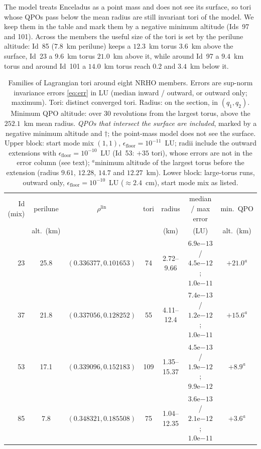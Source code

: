 \documentclass[11pt]{article}
\begin{document}
The model treats Enceladus as a point mass and does not see its surface, so tori whose QPOs pass
below the mean radius are still invariant tori of the model. We keep them in the table and mark
them by a negative minimum altitude (Ids~97 and 101). Across the members the useful size of the
tori is set by the perilune altitude: Id~85 ($7.8$~km perilune) keeps a $12.3$~km torus $3.6$~km
above the surface, Id~23 a $9.6$~km torus $21.0$~km above it, while around Id~97 a $9.4$~km torus and
around Id~101 a $14.0$~km torus reach $0.2$ and $3.4$~km below it.

\begin{table}[t]
\centering
\caption{Families of Lagrangian tori around eight NRHO members. Errors are sup-norm invariance
errors \eqref{eq:err} in LU (median inward / outward, or outward only; maximum). Tori: distinct
converged tori. Radius: on the section, in $(q_1,q_2)$. Minimum QPO altitude: over 30 revolutions
from the largest torus, above the $252.1$~km mean radius. \emph{QPOs that intersect the surface are
included}, marked by a negative minimum altitude and $\dagger$; the point-mass model does not see
the surface. Upper block: start mode mix $(1,1)$, $\epsilon_{\mathrm{floor}}=10^{-11}$~LU; radii
include the outward extensions with $\epsilon_{\mathrm{floor}}=10^{-10}$~LU (Id~53: $+35$ tori),
whose errors are not in the error column (see text); $^{a}$minimum altitude of the largest torus
before the extension (radius $9.61$, $12.28$, $14.7$ and $12.27$~km). Lower block: large-torus runs,
outward only, $\epsilon_{\mathrm{floor}}=10^{-10}$~LU ($\approx2.4$~cm), start mode mix as listed.}
\label{tab:families}
\small
\setlength{\tabcolsep}{3.5pt}
\begin{tabular}{rcccccc}
\toprule
Id (mix) & perilune & $\rho^{\mathrm{lin}}$ & tori & radius & median / max error & min.\ QPO \\
   & alt.\ (km) &                     &      & (km)   & (LU)               & alt.\ (km) \\
\midrule
23 & 25.8 & $(0.336377, 0.101653)$ & 74 & 2.72--9.66 & $6.9\mathrm{e}{-13}$ / $4.5\mathrm{e}{-12}$; $1.0\mathrm{e}{-11}$ & $+21.0^{a}$ \\
37 & 21.8 & $(0.337056, 0.128252)$ & 55 & 4.11--12.4 & $7.4\mathrm{e}{-13}$ / $1.2\mathrm{e}{-12}$; $1.0\mathrm{e}{-11}$ & $+15.6^{a}$ \\
53 & 17.1 & $(0.339096, 0.152183)$ & 109 & 1.35--15.37 & $4.5\mathrm{e}{-13}$ / $1.9\mathrm{e}{-12}$; $9.9\mathrm{e}{-12}$ & $+8.9^{a}$ \\
85 &  7.8 & $(0.348321, 0.185508)$ & 75 & 1.04--12.35 & $3.6\mathrm{e}{-13}$ / $2.1\mathrm{e}{-12}$; $1.0\mathrm{e}{-11}$ & $+3.6^{a}$ \\

\end{tabular}
\end{table}
\end{document}
